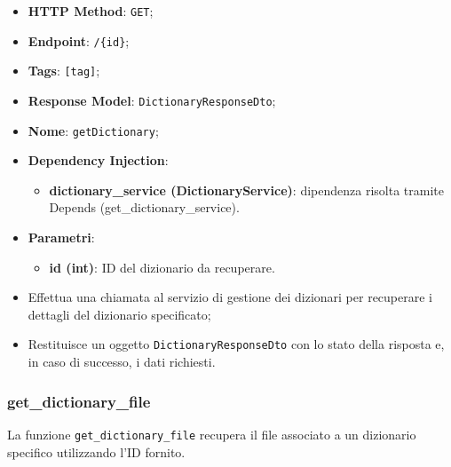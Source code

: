 \begin{itemize}
  \item \textbf{HTTP Method}: \texttt{GET};
  \item \textbf{Endpoint}: \texttt{/\{id\}};
  \item \textbf{Tags}: \texttt{[tag]};
  \item \textbf{Response Model}: \texttt{DictionaryResponseDto};
  \item \textbf{Nome}: \texttt{getDictionary};
  \item \textbf{Dependency Injection}:
  \begin{itemize}
    \item \textbf{dictionary\_service (DictionaryService)}: dipendenza risolta tramite Depends (get\_dictionary\_service).
  \end{itemize}
  \item \textbf{Parametri}:
  \begin{itemize}
    \item \textbf{id (int)}: ID del dizionario da recuperare.
  \end{itemize}
\end{itemize}

\begin{itemize}
  \item Effettua una chiamata al servizio di gestione dei dizionari per recuperare i dettagli del dizionario specificato;
  \item Restituisce un oggetto \texttt{DictionaryResponseDto} con lo stato della risposta e, in caso di successo, i dati richiesti.
\end{itemize}

\subsubsection{get\_dictionary\_file}

\par La funzione \texttt{get\_dictionary\_file} recupera il file associato a un dizionario specifico utilizzando l'ID fornito.

